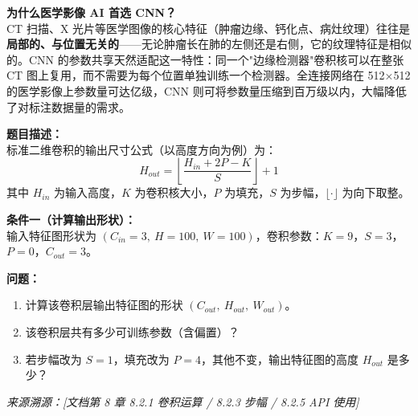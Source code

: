 \documentclass[a4paper,11pt]{ctexart}
\begin{document}
\begin{appbox}[现实应用场景]
    \textbf{为什么医学影像 AI 首选 CNN？}\\
    CT 扫描、X 光片等医学图像的核心特征（肿瘤边缘、钙化点、病灶纹理）往往是\textbf{局部的、与位置无关的}——无论肿瘤长在肺的左侧还是右侧，它的纹理特征是相似的。CNN 的参数共享天然适配这一特性：同一个"边缘检测器"卷积核可以在整张 CT 图上复用，而不需要为每个位置单独训练一个检测器。全连接网络在 512×512 的医学影像上参数量可达亿级，CNN 则可将参数量压缩到百万级以内，大幅降低了对标注数据量的需求。
\end{appbox}


\begin{problembox}
    \textbf{题目描述：}\\
    标准二维卷积的输出尺寸公式（以高度方向为例）为：
    \begin{equation}
        H_{out} = \left\lfloor \frac{H_{in} + 2P - K}{S} \right\rfloor + 1
    \end{equation}
    其中 $H_{in}$ 为输入高度，$K$ 为卷积核大小，$P$ 为填充，$S$ 为步幅，$\lfloor\cdot\rfloor$ 为向下取整。

    \vspace{0.2cm}
    \textbf{条件一（计算输出形状）：}\\
    输入特征图形状为 $(C_{in}=3,\ H=100,\ W=100)$，卷积参数：$K=9$，$S=3$，$P=0$，$C_{out}=3$。

    \vspace{0.2cm}
    \textbf{问题：}
    \begin{enumerate}[(1)]
        \item 计算该卷积层输出特征图的形状 $(C_{out},\ H_{out},\ W_{out})$。
        \item 该卷积层共有多少可训练参数（含偏置）？
        \item 若步幅改为 $S=1$，填充改为 $P=4$，其他不变，输出特征图的高度 $H_{out}$ 是多少？
    \end{enumerate}

    \vspace{0.2cm}
    {\color{gray}\small\textit{来源溯源：[文档第 8 章 8.2.1 卷积运算 / 8.2.3 步幅 / 8.2.5 API 使用]}}
\end{problembox}
\end{document}
